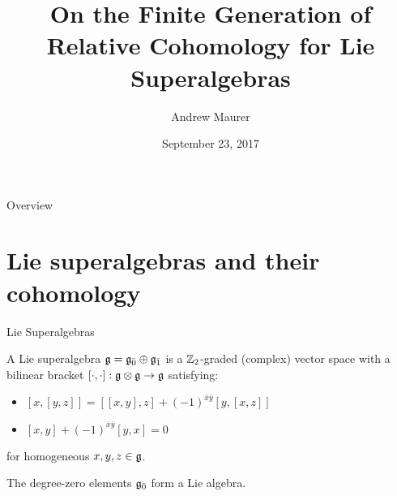 \documentclass{beamer}
\begin{document}
\author[A. Maurer]{Andrew Maurer}
\date{September 23, 2017}
\title[On the FG of $\H^\bullet$ for LSA]{On the Finite Generation of Relative Cohomology for Lie Superalgebras}

\begin{frame}
  \maketitle
\end{frame}

\begin{frame}{Overview}
  \tableofcontents
\end{frame}



\section[LSAs \& $\H^\bullet$]{Lie superalgebras and their cohomology}

\begin{frame}{Lie Superalgebras}
  \pause
  \begin{definition}
    A Lie superalgebra $\mathfrak{g} = {\mathfrak{g}}_{\bar{0}} \oplus {\mathfrak{g}}_{\bar{1}}$ is a $\mathbb{Z}_2$-graded (complex) vector space with a bilinear bracket $[\cdot,\cdot]: \mathfrak{g} \otimes \mathfrak{g} \to \mathfrak{g}$ satisfying: \pause
    \begin{itemize}
    \item $[x,[y,z]] = [[x,y],z] + (-1)^{\bar x \bar y} [y,[x,z]]$\pause
    \item $[x,y] + (-1)^{\bar x \bar y} [y,x] = 0$
    \end{itemize}
    for homogeneous $x,y,z \in \mathfrak{g}$.
  \end{definition}\pause
  \begin{example}
    The degree-zero elements ${\mathfrak{g}}_{\bar{0}}$ form a Lie algebra.
  \end{example}

\end{frame}
\end{document}
